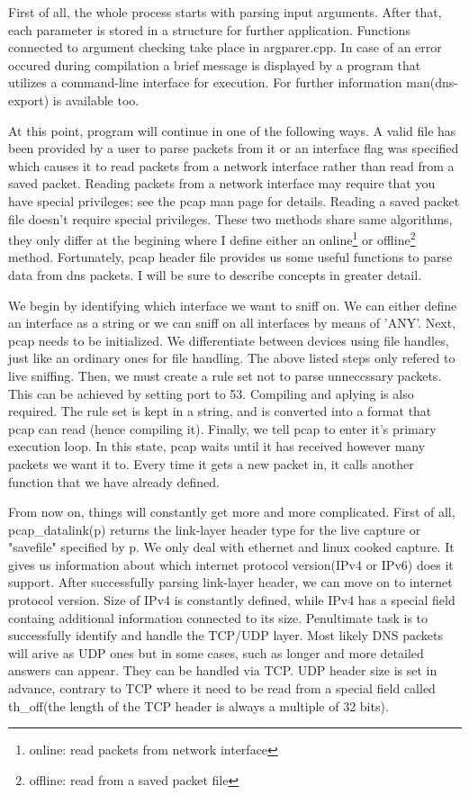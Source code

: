 \documentclass[11pt,a4paper]{article}
\begin{document}
First of all, the whole process starts with parsing input arguments. After that, each parameter is stored in a structure for further application. Functions connected to argument checking take place in argparer.cpp. In case of an error occured during compilation a brief message is displayed by a program that utilizes a command-line interface for execution. For further information man(dns-export) is available too.

At this point, program will continue in one of the following ways. A valid file has been provided by a user to parse packets from it or an interface flag was specified which causes it to read packets from a network interface rather than read from a saved packet. Reading packets from a network interface may require that you have special privileges; see the pcap man page for details. Reading a saved packet file doesn't require special privileges. These two methods share same algorithms, they only differ at the begining where I define either an online\footnote{online: read packets from network interface} or offline\footnote{offline: read from a saved packet file} method. Fortunately, pcap header file provides us some useful functions to parse data from dns packets. I will be sure to describe concepts in greater detail.

We begin by identifying which interface we want to sniff on. We can either define an interface as a string or we can sniff on all interfaces by means of 'ANY'. Next, pcap needs to be initialized. We differentiate between devices using file handles, just like an ordinary ones for file handling. The above listed steps only refered to live sniffing. Then, we must create a rule set not to parse unneccssary packets. This can be achieved by setting port to 53. Compiling and aplying is also required. The rule set is kept in a string, and is converted into a format that pcap can read (hence compiling it). Finally, we tell pcap to enter it's primary execution loop. In this state, pcap waits until it has received however many packets we want it to. Every time it gets a new packet in, it calls another function that we have already defined.

From now on, things will constantly get more and more complicated. First of all, pcap\_datalink(p) returns the link-layer header type for the live capture or "savefile" specified by p. We only deal with ethernet and linux cooked capture. It gives us information about which internet protocol version(IPv4 or IPv6) does it support. After successfully parsing link-layer header, we can move on to internet protocol version. Size of IPv4 is constantly defined, while IPv4 has a special field containg additional information connected to its size. Penultimate task is to successfully identify and handle the TCP/UDP layer. Most likely DNS packets will arive as UDP ones but in some cases, such as longer and more detailed answers can appear. They can be handled via TCP. UDP header size is set in advance, contrary to TCP where it need to be read from a special field called th\_off(the length of the TCP header is always a multiple of 32 bits).
\end{document}
